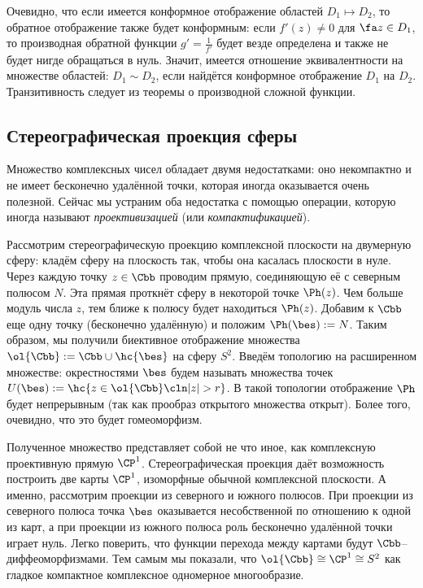 \documentclass[a4paper]{article}
\begin{document}
Очевидно, что если имеется конформное отображение областей $D_1 \mapsto D_2$, то обратное отображение
также будет конформным: если $f'(z) \neq 0$ для $\fa z \in D_1$, то производная обратной функции
$g' =\frac{1}{f'}$ будет везде определена и также не будет нигде обращаться в нуль.
Значит, имеется отношение эквивалентности на множестве областей: $D_1 \sim D_2$, если найдётся конформное
отображение $D_1$ на $D_2$. Транзитивность следует из теоремы о производной сложной функции.

\subsection{Стереографическая проекция сферы}

Множество комплексных чисел обладает двумя недостатками: оно некомпактно и не имеет бесконечно удалённой
точки, которая иногда оказывается очень полезной. Сейчас мы устраним оба недостатка с помощью
операции, которую иногда называют \emph{проективизацией} (или \emph{компактификацией}).

Рассмотрим стереографическую проекцию комплексной плоскости на двумерную сферу: кладём сферу на плоскость так,
чтобы она касалась плоскости в нуле. Через каждую точку $z\in \Cbb$ проводим прямую, соединяющую её с
северным полюсом $N$. Эта прямая проткнёт сферу в некоторой точке $\Ph(z)$. Чем больше модуль числа $z$, тем
ближе к полюсу будет находиться $\Ph(z)$. Добавим к $\Cbb$ еще одну точку (бесконечно удалённую) и положим
$\Ph(\bes) := N$. Таким образом, мы получили биективное отображение множества
$\ol{\Cbb} := \Cbb \cup \hc{\bes}$ на сферу $S^2$. Введём топологию на расширенном множестве: окрестностями $\bes$
будем называть множества точек $U(\bes) := \hc{z \in \ol{\Cbb} \cln |z| > r}$. В такой топологии отображение $\Ph$
будет непрерывным (так как прообраз открытого множества открыт). Более того, очевидно, что это будет гомеоморфизм.

Полученное множество представляет собой не что иное, как комплексную проективную прямую $\CP^1$. Стереографическая
проекция даёт возможность построить две карты $\CP^1$, изоморфные обычной комплексной плоскости. А именно, рассмотрим
проекции из северного и южного полюсов. При проекции из северного полюса точка $\bes$ оказывается несобственной
по отношению к одной из карт, а при проекции из южного полюса роль бесконечно удалённой точки играет нуль.
Легко поверить, что функции перехода между картами будут $\Cbb$-- диффеоморфизмами. Тем самым мы показали, что $\ol{\Cbb} \cong \CP^1 \cong S^2$
как гладкое компактное комплексное одномерное многообразие.
\end{document}
